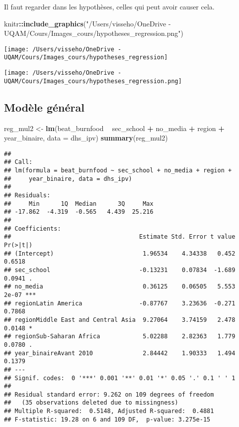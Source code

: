 \documentclass[
]{article}
\newenvironment{Shaded}{\begin{snugshade}}{\end{snugshade}}
\newcommand{\DataTypeTok}[1]{\textcolor[rgb]{0.13,0.29,0.53}{#1}}
\newcommand{\KeywordTok}[1]{\textcolor[rgb]{0.13,0.29,0.53}{\textbf{#1}}}
\newcommand{\NormalTok}[1]{#1}
\newcommand{\OperatorTok}[1]{\textcolor[rgb]{0.81,0.36,0.00}{\textbf{#1}}}
\newcommand{\StringTok}[1]{\textcolor[rgb]{0.31,0.60,0.02}{#1}}
\begin{document}
Il faut regarder dans les hypothèses, celles qui peut avoir causer cela.

\begin{Shaded}
\begin{Highlighting}[]
\NormalTok{knitr}\OperatorTok{::}\KeywordTok{include_graphics}\NormalTok{(}\StringTok{"/Users/visseho/OneDrive - UQAM/Cours/Images_cours/hypotheses_regression.png"}\NormalTok{)}
\end{Highlighting}
\end{Shaded}

\texttt{[image: /Users/visseho/OneDrive - UQAM/Cours/Images\_cours/hypotheses\_regression]}

\texttt{[image: /Users/visseho/OneDrive - UQAM/Cours/Images\_cours/hypotheses\_regression.png]}

\hypertarget{moduxe8le-guxe9nuxe9ral}{%
\subsection{Modèle général}\label{moduxe8le-guxe9nuxe9ral}}

\begin{Shaded}
\begin{Highlighting}[]
\NormalTok{reg_mul2 <-}\StringTok{ }\KeywordTok{lm}\NormalTok{(beat_burnfood }\OperatorTok{~}\StringTok{ }\NormalTok{sec_school }\OperatorTok{+}\StringTok{ }\NormalTok{no_media }\OperatorTok{+}\StringTok{ }\NormalTok{region }\OperatorTok{+}\StringTok{ }\NormalTok{year_binaire, }\DataTypeTok{data =}\NormalTok{ dhs_ipv)}
\KeywordTok{summary}\NormalTok{(reg_mul2)}
\end{Highlighting}
\end{Shaded}

\begin{verbatim}
## 
## Call:
## lm(formula = beat_burnfood ~ sec_school + no_media + region + 
##     year_binaire, data = dhs_ipv)
## 
## Residuals:
##     Min      1Q  Median      3Q     Max 
## -17.862  -4.319  -0.565   4.439  25.216 
## 
## Coefficients:
##                                    Estimate Std. Error t value Pr(>|t|)    
## (Intercept)                         1.96534    4.34338   0.452   0.6518    
## sec_school                         -0.13231    0.07834  -1.689   0.0941 .  
## no_media                            0.36125    0.06505   5.553    2e-07 ***
## regionLatin America                -0.87767    3.23636  -0.271   0.7868    
## regionMiddle East and Central Asia  9.27064    3.74159   2.478   0.0148 *  
## regionSub-Saharan Africa            5.02288    2.82363   1.779   0.0780 .  
## year_binaireAvant 2010              2.84442    1.90333   1.494   0.1379    
## ---
## Signif. codes:  0 '***' 0.001 '**' 0.01 '*' 0.05 '.' 0.1 ' ' 1
## 
## Residual standard error: 9.262 on 109 degrees of freedom
##   (35 observations deleted due to missingness)
## Multiple R-squared:  0.5148, Adjusted R-squared:  0.4881 
## F-statistic: 19.28 on 6 and 109 DF,  p-value: 3.275e-15
\end{verbatim}
\end{document}
